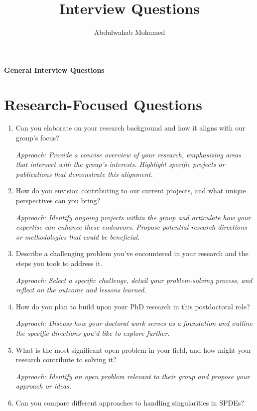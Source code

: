 \documentclass[12pt]{article}
\title{Interview Questions}
\author{Abdulwahab Mohamed}
\numberwithin{equation}{section}
\begin{document}
\begin{center}
    {\Large \textbf{General Interview Questions}} \\ \vspace{1pt}
\end{center}

\section{Research-Focused Questions}
\begin{enumerate}
    \item Can you elaborate on your research background and how it aligns with our group's focus?
    
    \textit{Approach: Provide a concise overview of your research, emphasizing areas that intersect with the group's interests. Highlight specific projects or publications that demonstrate this alignment.}

    \item How do you envision contributing to our current projects, and what unique perspectives can you bring?
    
    \textit{Approach: Identify ongoing projects within the group and articulate how your expertise can enhance these endeavors. Propose potential research directions or methodologies that could be beneficial.}

    \item Describe a challenging problem you've encountered in your research and the steps you took to address it.
    
    \textit{Approach: Select a specific challenge, detail your problem-solving process, and reflect on the outcome and lessons learned.}

    \item How do you plan to build upon your PhD research in this postdoctoral role?
    
    \textit{Approach: Discuss how your doctoral work serves as a foundation and outline the specific directions you'd like to explore further.}

    \item What is the most significant open problem in your field, and how might your research contribute to solving it?
    
    \textit{Approach: Identify an open problem relevant to their group and propose your approach or ideas.}

    \item Can you compare different approaches to handling singularities in SPDEs?
    

\end{enumerate}
\end{document}

